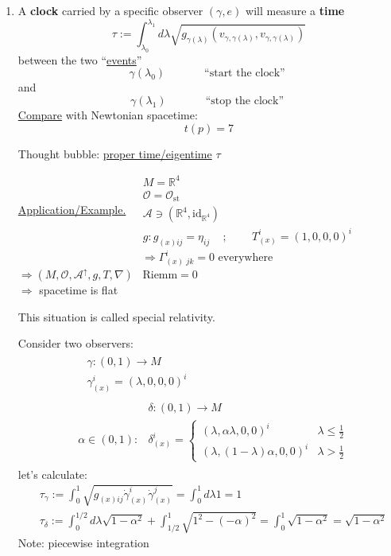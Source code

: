 	\begin{enumerate}
		\item[(P3)] A \textbf{clock} carried by a specific observer $(\gamma, e)$ will measure a \textbf{time}
		\[
		\tau := \int_{\lambda_0}^{\lambda_1} d\lambda \sqrt{ g_{\gamma(\lambda)}(v_{\gamma,\gamma(\lambda)}, v_{\gamma,\gamma(\lambda)}) }
		\]
		between the two ``\underline{events}''
		\[
		\gamma(\lambda_0) \quad \quad \quad \, \text{ ``start the clock'' }
		\]
		and 
		\[
		\gamma(\lambda_1) \quad \quad \quad \, \text{ ``stop the clock'' }
		\]
		\underline{Compare} with Newtonian spacetime:
		\[
		t(p)=7
		\]
		
		Thought bubble: \underline{proper time/eigentime} $\tau$
		
		\underline{Application/Example.}
		$\begin{aligned}
		& M = \mathbb{R}^4 \\ 
		& \mathcal{O} = \mathcal{O}_{\text{st}} \\
		& \mathcal{A} \ni (\mathbb{R}^4, \text{id}_{\mathbb{R}^4} ) \\ 
		& g : g_{(x)ij} = \eta_{ij} \quad \, ; \quad \quad \, T_{(x)}^i =(1,0,0,0)^i
		\end{aligned}
		$
		\[
		\Longrightarrow \Gamma_{(x) \, \, jk }^i = 0 \text{ everywhere }
		\]
		$\Longrightarrow (M,\mathcal{O}, \mathcal{A}^{\uparrow},g,T,\nabla)$ \quad \, $\text{Riemm}=0$ \\
		$\Longrightarrow $ spacetime is flat
		
		This situation is called special relativity.
		
		Consider two observers: 
		\[
		\begin{aligned} & 
		\begin{aligned}
		& \gamma : (0,1) \to M \\ 
		& \gamma_{(x)}^i = (\lambda , 0 ,0  ,0 )^i \end{aligned} \\
		& 
		\begin{aligned}
		& \delta :(0,1) \to M \\
		\alpha \in (0,1) :   & \delta_{(x)}^i = \begin{cases} ( \lambda , \alpha \lambda , 0 , 0)^i & \lambda \leq \frac{1}{2} \\ 
		(\lambda, (1-\lambda)\alpha, 0,0)^i & \lambda > \frac{1}{2} \end{cases}
		\end{aligned}
		\end{aligned}
		\]
		let's calculate:
		\[
		\begin{aligned}
		& \tau_{\gamma}:= \int_0^1 \sqrt{ g_{(x)ij} \dot{\gamma}^i_{(x)} \dot{\gamma}^j_{(x)} } = \int_0^1 d\lambda 1 = 1 \\
		& \tau_{\delta} := \int_0^{1/2} d\lambda \sqrt{ 1- \alpha^2} + \int_{1/2}^1 \sqrt{ 1^2 - (-\alpha)^2 } = \int_0^1 \sqrt{ 1 - \alpha^2 } = \sqrt{ 1 - \alpha^2}
		\end{aligned}
		\]
		Note: piecewise integration
		

\end{enumerate}
